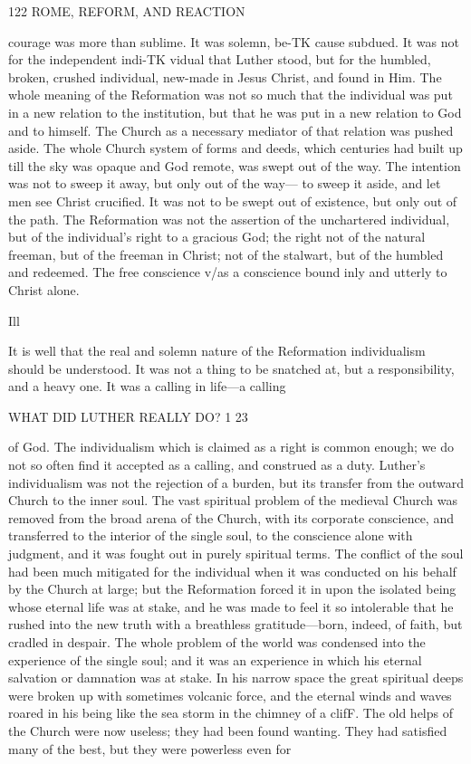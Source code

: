 \documentclass[12pt,a5paper,oneside]{book}
\begin{document}
122 ROME, REFORM, AND REACTION 

courage was more than sublime. It was solemn, be-TK
cause subdued. It was not for the independent indi-TK
vidual that Luther stood, but for the humbled, broken, 
crushed individual, new-made in Jesus Christ, and 
found in Him. The whole meaning of the Reformation 
was not so much that the individual was put in a new 
relation to the institution, but that he was put in a 
new relation to God and to himself. The Church as a 
necessary mediator of that relation was pushed aside. 
The whole Church system of forms and deeds, which 
centuries had built up till the sky was opaque and God 
remote, was swept out of the way. The intention 
was not to sweep it away, but only out of the way---
to sweep it aside, and let men see Christ crucified. It 
was not to be swept out of existence, but only out of 
the path. The Reformation was not the assertion of 
the unchartered individual, but of the individual's right 
to a gracious God; the right not of the natural freeman, 
but of the freeman in Christ; not of the stalwart, but 
of the humbled and redeemed. The free conscience v/as 
a conscience bound inly and utterly to Christ alone. 

Ill 

It is well that the real and solemn nature of the 
Reformation individualism should be understood. It 
was not a thing to be snatched at, but a responsibility, 
and a heavy one. It was a calling in life---a calling 



WHAT DID LUTHER REALLY DO? 1 23 

of God. The individualism which is claimed as a 
right is common enough; we do not so often find 
it accepted as a calling, and construed as a duty. 
Luther's individualism was not the rejection of a 
burden, but its transfer from the outward Church to 
the inner soul. The vast spiritual problem of the 
medieval Church was removed from the broad arena 
of the Church, with its corporate conscience, and 
transferred to the interior of the single soul, to the 
conscience alone with judgment, and it was fought out 
in purely spiritual terms. The conflict of the soul had 
been much mitigated for the individual when it was 
conducted on his behalf by the Church at large; but 
the Reformation forced it in upon the isolated being 
whose eternal life was at stake, and he was made to 
feel it so intolerable that he rushed into the new truth 
with a breathless gratitude---born, indeed, of faith, but 
cradled in despair. The whole problem of the world 
was condensed into the experience of the single soul; 
and it was an experience in which his eternal salvation 
or damnation was at stake. In his narrow space the 
great spiritual deeps were broken up with sometimes 
volcanic force, and the eternal winds and waves roared 
in his being like the sea storm in the chimney of a 
clifF. The old helps of the Church were now useless; 
they had been found wanting. They had satisfied 
many of the best, but they were powerless even for 
\end{document}
